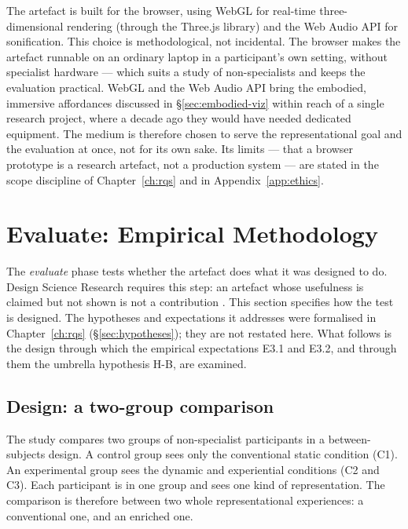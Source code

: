 The artefact is built for the browser, using WebGL for real-time three-dimensional rendering (through the Three.js library) and the Web Audio API for sonification. This choice is methodological, not incidental. The browser makes the artefact runnable on an ordinary laptop in a participant's own setting, without specialist hardware --- which suits a study of non-specialists and keeps the evaluation practical. WebGL and the Web Audio API bring the embodied, immersive affordances discussed in \S\ref{sec:embodied-viz} within reach of a single research project, where a decade ago they would have needed dedicated equipment. The medium is therefore chosen to serve the representational goal and the evaluation at once, not for its own sake. Its limits --- that a browser prototype is a research artefact, not a production system --- are stated in the scope discipline of Chapter~\ref{ch:rqs} and in Appendix~\ref{app:ethics}.
 
\section{Evaluate: Empirical Methodology}
\label{sec:evaluate-methodology}
 
The \emph{evaluate} phase tests whether the artefact does what it was designed to do. Design Science Research requires this step: an artefact whose usefulness is claimed but not shown is not a contribution \citep{hevner2004}. This section specifies how the test is designed. The hypotheses and expectations it addresses were formalised in Chapter~\ref{ch:rqs} (\S\ref{sec:hypotheses}); they are not restated here. What follows is the design through which the empirical expectations E3.1 and E3.2, and through them the umbrella hypothesis H-B, are examined.
 
\subsection{Design: a two-group comparison}
\label{subsec:evaluate-design}
 
The study compares two groups of non-specialist participants in a between-subjects design. A control group sees only the conventional static condition (C1). An experimental group sees the dynamic and experiential conditions (C2 and C3). Each participant is in one group and sees one kind of representation. The comparison is therefore between two whole representational experiences: a conventional one, and an enriched one.
 
